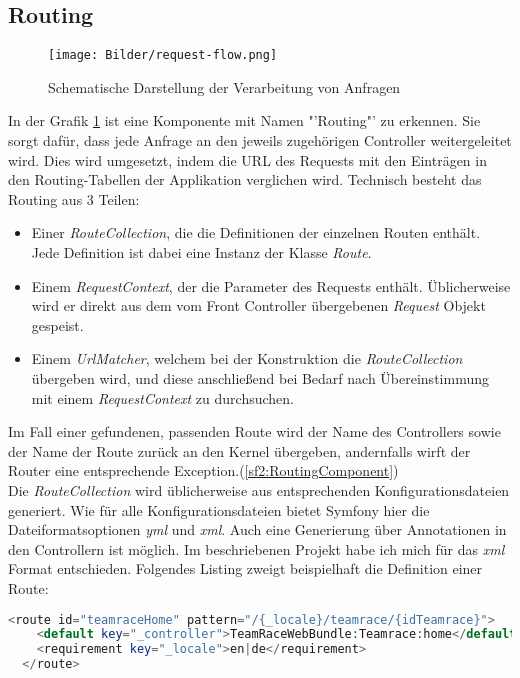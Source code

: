\documentclass[12pt]{report}
\begin{document}
\subsection{Routing}

\begin{figure}[htp]
\centering
\texttt{[image: Bilder/request-flow.png]}
\caption{Schematische Darstellung der Verarbeitung von Anfragen \cite{sf2:HTTPFundamentals}}
\label{fig:RequestFlow}
\end{figure}
In der Grafik \ref{fig:RequestFlow} ist eine Komponente mit Namen "'Routing"' zu erkennen. Sie sorgt dafür, dass jede Anfrage an den jeweils zugehörigen Controller weitergeleitet wird. Dies wird umgesetzt, indem die URL des Requests mit den Einträgen in den Routing-Tabellen der Applikation verglichen wird. Technisch besteht das Routing aus 3 Teilen: 

\begin{itemize}
\item{Einer \emph{RouteCollection}, die die Definitionen der einzelnen Routen enthält. Jede Definition ist dabei eine Instanz der Klasse \emph{Route}}.
\item{Einem \emph{RequestContext}, der die Parameter des Requests enthält. Üblicherweise wird er direkt aus dem vom Front Controller übergebenen \emph{Request} Objekt gespeist.}
\item{Einem \emph{UrlMatcher}, welchem bei der Konstruktion die \emph{RouteCollection} übergeben wird, und diese anschließend bei Bedarf nach Übereinstimmung mit einem \emph{RequestContext} zu durchsuchen.}
\end{itemize}

Im Fall einer gefundenen, passenden Route wird der Name des Controllers sowie der Name der Route zurück an den Kernel übergeben, andernfalls wirft der Router eine entsprechende Exception.(\ref{sf2:RoutingComponent})\\

Die \emph{RouteCollection} wird üblicherweise aus entsprechenden Konfigurationsdateien generiert. Wie für alle Konfigurationsdateien bietet Symfony hier die Dateiformatsoptionen \emph{yml} und \emph{xml}. Auch eine Generierung über Annotationen in den Controllern ist möglich. Im beschriebenen Projekt habe ich mich für das \emph{xml} Format entschieden. Folgendes Listing zweigt beispielhaft die Definition einer Route:

\begin{lstlisting}[language=PHP, caption=Auszug aus\\ src/TeamRace/WebBundle/Resources/config/routing.xml]
  <route id="teamraceHome" pattern="/{_locale}/teamrace/{idTeamrace}">
    <default key="_controller">TeamRaceWebBundle:Teamrace:home</default>
    <requirement key="_locale">en|de</requirement>
  </route>
  
\end{lstlisting}
  
\end{document}
